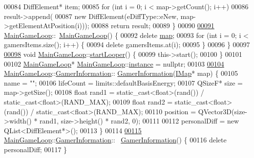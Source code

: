 \begin{DoxyCode}
00084   DiffElement* item;
00085   \textcolor{keywordflow}{for} (\textcolor{keywordtype}{int} i = 0; i < map->getCount(); i++)
00086     result->append(
00087         \textcolor{keyword}{new} DiffElement(eDiffType::eNew, map->getElementAtPosition(i)));
00088   \textcolor{keywordflow}{return} result;
00089 \}
00090 
\hyperlink{a00209_aeeabdbe46a5aeb891d7da7fd9430d0cb}{00091} \hyperlink{a00209_ac4cd47d8b350ae45ea09aaecad11a684}{MainGameLoop}::~\hyperlink{a00209_aeeabdbe46a5aeb891d7da7fd9430d0cb}{MainGameLoop}() \{
00092   \textcolor{keyword}{delete} \hyperlink{a00209_ae0ccec14d7db91cf6db41349a73b41a7}{map};
00093   \textcolor{keywordflow}{for} (\textcolor{keywordtype}{int} i = 0; i < gamersItems.size(); i++) \{
00094     \textcolor{keyword}{delete} gamersItems.at(i);
00095   \}
00096 \}
00097 
\hyperlink{a00209_a2329f4e9c9a4ad9ecbed39d5c297245f}{00098} \textcolor{keywordtype}{void} \hyperlink{a00209_ac4cd47d8b350ae45ea09aaecad11a684}{MainGameLoop}::\hyperlink{a00209_a2329f4e9c9a4ad9ecbed39d5c297245f}{startLooper}() \{
00099   \textcolor{keyword}{this}->start();
00100 \}
00101 
00102 \hyperlink{a00209_ac4cd47d8b350ae45ea09aaecad11a684}{MainGameLoop}* \hyperlink{a00209_ac4cd47d8b350ae45ea09aaecad11a684}{MainGameLoop}::\hyperlink{a00209_a2578ca393ef9030407e5b3ac17b9f6ab}{instance} = nullptr;
00103 
\hyperlink{a00213_a6b58de3576e4b204fc38073794dfa1d2}{00104} \hyperlink{a00209_ac4cd47d8b350ae45ea09aaecad11a684}{MainGameLoop}::\hyperlink{a00213_a4c89a46d22105667ff462e4e944daaac}{GamerInformation}::
      \hyperlink{a00213_a6b58de3576e4b204fc38073794dfa1d2}{GamerInformation}(\hyperlink{a00165}{IMap}* map) \{
00105   name = \textcolor{stringliteral}{""};
00106   lifeCount = limits::defaultBasisEnergy;
00107   QSizeF* size = map->getSize();
00108   \textcolor{keywordtype}{float} rand1 = \textcolor{keyword}{static\_cast}<\textcolor{keywordtype}{float}>(rand()) / \textcolor{keyword}{static\_cast}<\textcolor{keywordtype}{float}>(RAND\_MAX);
00109   \textcolor{keywordtype}{float} rand2 = \textcolor{keyword}{static\_cast}<\textcolor{keywordtype}{float}>(rand()) / \textcolor{keyword}{static\_cast}<\textcolor{keywordtype}{float}>(RAND\_MAX);
00110   position = QVector3D(size->width() * rand1, size->height() * rand2, 0);
00111 
00112   personalDiff = \textcolor{keyword}{new} QList<DiffElement*>();
00113 \}
00114 
\hyperlink{a00213_a19842dcddbd89a64210977394060ca3a}{00115} \hyperlink{a00209_ac4cd47d8b350ae45ea09aaecad11a684}{MainGameLoop}::\hyperlink{a00213_a4c89a46d22105667ff462e4e944daaac}{GamerInformation}::~
      \hyperlink{a00213_a19842dcddbd89a64210977394060ca3a}{GamerInformation}() \{
00116   \textcolor{keyword}{delete} personalDiff;
00117 \}
\end{DoxyCode}

